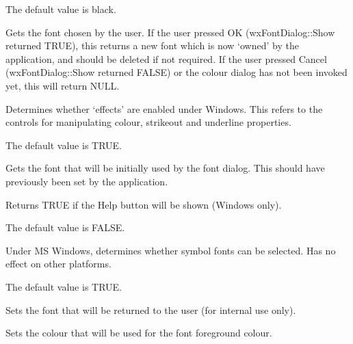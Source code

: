 The default value is black.



Gets the font chosen by the user. If the user pressed OK (wxFontDialog::Show returned TRUE), this returns
a new font which is now `owned' by the application, and should be deleted
if not required. If the user pressed Cancel (wxFontDialog::Show returned FALSE) or
the colour dialog has not been invoked yet, this will return NULL.



Determines whether `effects' are enabled under Windows. This refers to the
controls for manipulating colour, strikeout and underline properties.

The default value is TRUE.



Gets the font that will be initially used by the font dialog. This should have
previously been set by the application.



Returns TRUE if the Help button will be shown (Windows only).

The default value is FALSE.



Under MS Windows, determines whether symbol fonts can be selected. Has no
effect on other platforms.

The default value is TRUE.



Sets the font that will be returned to the user (for internal use only).



Sets the colour that will be used for the font foreground colour.

